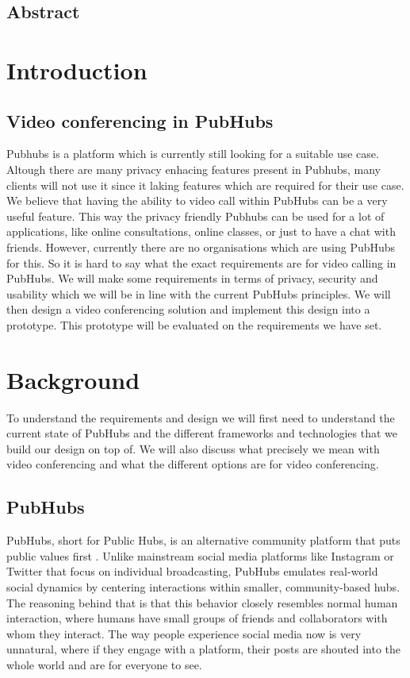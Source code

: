 \documentclass{report}
\begin{document}
\tableofcontents

\newpage
\section*{Abstract}


\chapter{Introduction}


\section{Video conferencing in PubHubs}
Pubhubs is a platform which is currently still looking for a suitable use case. Altough there are many privacy
enhacing features present in Pubhubs, many clients will not use it since it laking features which are required for
their use case. We believe that having the ability to video call within PubHubs can be a very useful feature.
This way the privacy friendly Pubhubs can be used for a lot of applications, like online consultations, online
classes, or just to have a chat with friends. However, currently there are no organisations which are using PubHubs for this. So it is hard to say what the exact requirements are
for video calling in PubHubs. We will make some requirements in terms of privacy, security and usability which we
will be in line with the current PubHubs principles. We will then design a video conferencing solution and implement
this design into a prototype. This prototype will be evaluated on the requirements we have set.


\chapter{Background}
To understand the requirements and design we will first need to understand the current state of PubHubs and the
different frameworks and technologies that we build our design on top of. We will also discuss what precisely we mean
with video conferencing and what the different options are for video conferencing.

\section{PubHubs}
PubHubs, short for Public Hubs, is an alternative community platform that puts public values first
\cite{jacobs_pubhubs_2023}
. Unlike mainstream social media platforms like Instagram or Twitter that focus on individual broadcasting, PubHubs
emulates real-world social dynamics by centering interactions within smaller, community-based hubs. The reasoning
behind that is that this behavior closely resembles normal human interaction, where humans have small groups of
friends and collaborators with whom they interact. The way people experience social media now is very unnatural,
where if they engage with a platform, their posts are shouted into the whole world and are for everyone to see.
\end{document}
